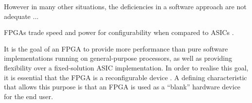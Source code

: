 However in many other situations, the deficiencies in a software approach are
not adequate ...

\glspl{FPGA} trade speed and power for configurability when compared to
\glspl{ASIC} \cite{Hauck:2007}.

It is the goal of an \gls{FPGA} to provide more performance than pure software
implementations running on general-purpose processors, as well as providing
flexibility over a fixed-solution \gls{ASIC} implementation. In order to realise
this goal, it is essential that the \gls{FPGA} is a reconfigurable device
\cite{Hauck:2007}. A defining characteristic that allows this purpose is that
an \gls{FPGA} is used as a ``blank'' hardware device for the end user.